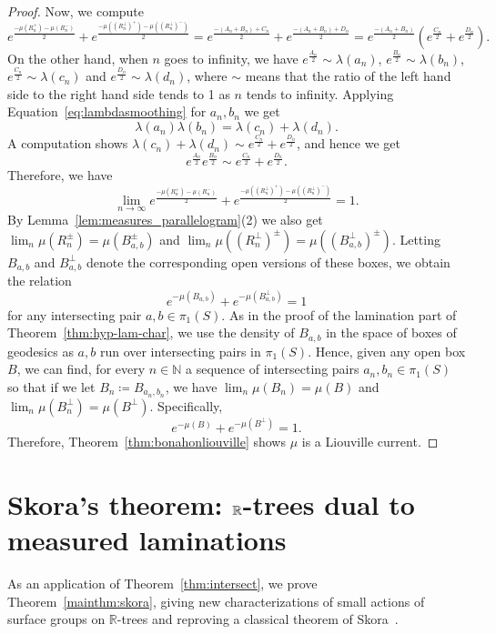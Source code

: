 \documentclass[11pt]{amsart}
\numberwithin{equation}{section}
\numberwithin{figure}{section}
\theoremstyle{definition}
\theoremstyle{plain}
\begin{document}
\begin{proof}
Now, we compute
\[
e^{\frac{-\mu(R_n^+)-\mu(R_n^-)}{2}} + e^{\frac{-\mu((R_n^{\perp})^+)-\mu((R_n^{\perp})^-)}{2}} = e^{\frac{-(A_n+B_n)+C_n}{2}} + e^{\frac{-(A_n+B_n)+D_n}{2}} = e^{\frac{-(A_n+B_n)}{2}} (e^{\frac{C_n}{2}} + e^{\frac{D_n}{2}}).
\]
On the other hand, when $n$ goes to infinity, we have $e^{\frac{A_n}{2}} \sim \lambda(a_n)$, $e^{\frac{B_n}{2}} \sim \lambda(b_n)$, $e^{\frac{C_n}{2}} \sim \lambda(c_n)$ and $e^{\frac{D_n}{2}} \sim \lambda(d_n)$, where $\sim$ means that the ratio of the left hand side to the right hand side tends to 1 as $n$ tends to infinity. Applying Equation~\eqref{eq:lambdasmoothing} for $a_n, b_n$ we get
\[
\lambda(a_n)\lambda(b_n) = \lambda(c_n) + \lambda(d_n).
\]
A computation shows $\lambda(c_n) + \lambda(d_n) \sim e^{\frac{C_n}{2}}+e^{\frac{D_n}{2}}$, and hence we get
\[
e^{\frac{A_n}{2}}e^{\frac{B_n}{2}} \sim e^{\frac{C_n}{2}}+e^{\frac{D_n}{2}}.
\]
Therefore, we have
\[
\lim_{n\to\infty} e^{\frac{-\mu(R_n^+)-\mu(R_n^-)}{2}} + e^{\frac{-\mu((R_n^{\perp})^+)-\mu((R_n^{\perp})^-)}{2}}=1.
\]
By Lemma~\ref{lem:measures_parallelogram}(2) we also get $\lim_n \mu(R_n^{\pm})=\mu(B_{a,b}^{\pm})$ and $\lim_n \mu((R_n^{\perp})^{\pm})=\mu((B_{a,b}^{\perp})^{\pm})$.
 Letting $B_{a,b}$ and $B_{a,b}^\perp$ denote the corresponding open versions of these boxes, we obtain the relation
\[
e^{-\mu(B_{a,b})} + e^{-\mu(B_{a,b}^{\perp})} =1
\]
for any intersecting pair $a,b \in \pi_1(S)$.
As in the proof of the lamination part of Theorem~\ref{thm:hyp-lam-char}, we use the density of $B_{a,b}$ in the space of boxes of geodesics as $a,b$ run over intersecting pairs in $\pi_1(S)$. Hence, given any open box $B$, we can find, for every $n \in \mathbb{N}$ a sequence of intersecting pairs $a_n, b_n \in \pi_1(S)$ so that if we let $B_n \coloneqq B_{a_n, b_n}$, we have $\lim_n \mu(B_n) =\mu(B)$ and $\lim_n \mu(B_n^{\perp}) = \mu(B^\perp)$. Specifically,
\[
e^{-\mu(B)} + e^{-\mu(B^{\perp})}=1.
\]
Therefore, Theorem~\ref{thm:bonahonliouville} shows $\mu$ is a Liouville current.
\end{proof}



\section{Skora's theorem: \texorpdfstring{$\protect\mathbb{R}$-trees}{Rtrees} dual to measured laminations}
\label{sec:skora}


As an application of Theorem~\ref{thm:intersect}, we prove
Theorem~\ref{mainthm:skora},
giving new
characterizations of small actions of surface groups on
$\mathbb{R}$-trees and reproving a classical theorem of
 Skora~\cite{Sko90:GeometricAction}.
\end{document}
